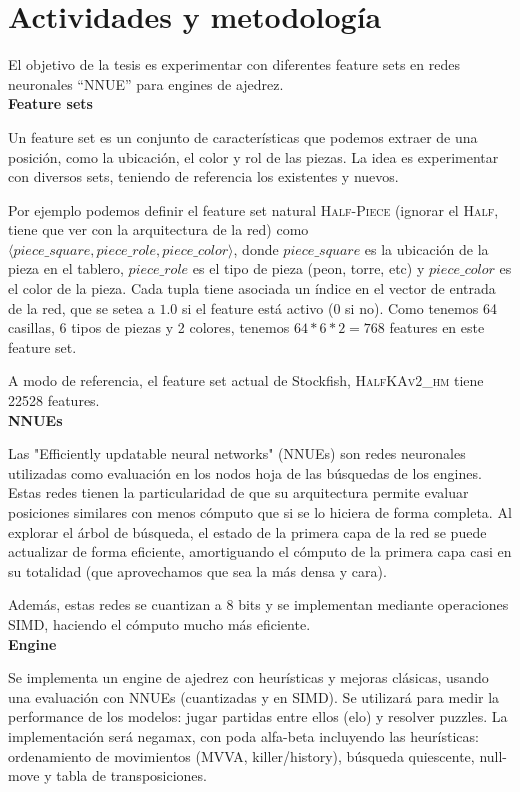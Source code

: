 \section*{Actividades y metodología}

\blindtext[1]


El objetivo de la tesis es experimentar con diferentes feature sets en redes neuronales ``NNUE'' para engines de ajedrez. \\

\textbf{Feature sets}

Un feature set es un conjunto de características que podemos extraer de una posición, como la ubicación, el color y rol de las piezas. La idea es experimentar con diversos sets, teniendo de referencia los existentes y nuevos.

Por ejemplo podemos definir el feature set natural \textsc{Half-Piece} (ignorar el \textsc{Half}, tiene que ver con la arquitectura de la red) como $\langle piece\_square, piece\_role, piece\_color \rangle$, donde $piece\_square$ es la ubicación de la pieza en el tablero, $piece\_role$ es el tipo de pieza (peon, torre, etc) y $piece\_color$ es el color de la pieza. Cada tupla tiene asociada un índice en el vector de entrada de la red, que se setea a $1.0$ si el feature está activo (0 si no). Como tenemos 64 casillas, 6 tipos de piezas y 2 colores, tenemos $64*6*2=768$ features en este feature set.

A modo de referencia, el feature set actual de Stockfish, \textsc{HalfKAv2\_hm} tiene 22528 features. \\

\textbf{NNUEs}

Las "Efficiently updatable neural networks" (NNUEs) son redes neuronales utilizadas como evaluación en los nodos hoja de las búsquedas de los engines. Estas redes tienen la particularidad de que su arquitectura permite evaluar posiciones similares con menos cómputo que si se lo hiciera de forma completa. Al explorar el árbol de búsqueda, el estado de la primera capa de la red se puede actualizar de forma eficiente, amortiguando el cómputo de la primera capa casi en su totalidad (que aprovechamos que sea la más densa y cara).

Además, estas redes se cuantizan a 8 bits y se implementan mediante operaciones SIMD, haciendo el cómputo mucho más eficiente. \\

\textbf{Engine}

Se implementa un engine de ajedrez con heurísticas y mejoras clásicas, usando una evaluación con NNUEs (cuantizadas y en SIMD). Se utilizará para medir la performance de los modelos: jugar partidas entre ellos (elo) y resolver puzzles.
La implementación será negamax, con poda alfa-beta incluyendo las heurísticas: ordenamiento de movimientos (MVVA, killer/history), búsqueda quiescente, null-move y tabla de transposiciones. \\


